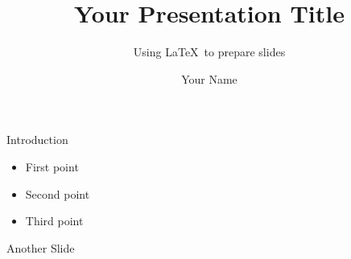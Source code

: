 \documentclass{beamer}
\title{Your Presentation Title}
\subtitle{Using \LaTeX\ to prepare slides}
\author{Your Name}
\begin{document}
\maketitle


\begin{frame}{Introduction}
    \begin{itemize}
        \item First point
        \item Second point
        \item Third point
    \end{itemize}
\end{frame}

\begin{frame}{Another Slide}
\end{frame}
\end{document}
